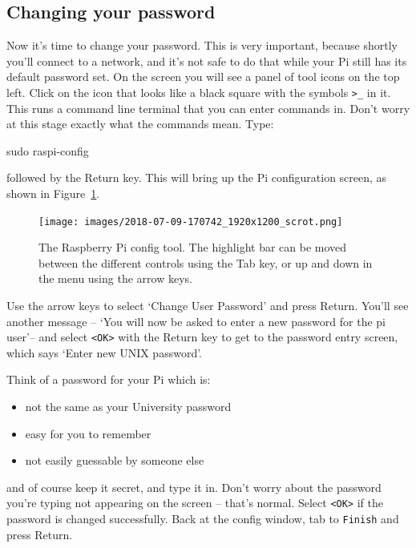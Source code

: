 \subsection{Changing your password}
\label{configscreen}

Now it's time to change your password. This is very important, because
shortly you'll connect to a network, and it's not safe to do that
while your Pi still has its default password set.  On the screen you
will see a panel of tool icons on the top left. 
\cbstart Click on the icon that
looks like a black square with the symbols \verb+>_+ in it. This runs a command line terminal that
you can enter commands in. Don't worry at this stage exactly what the
commands mean. Type:
\cbend

\begin{ttoutenv}
sudo raspi-config
\end{ttoutenv}

followed by the Return key. This will bring up the Pi configuration screen, as shown in Figure~\ref{figure:raspi-config}.

\begin{figure}
\centerline{\texttt{[image: images/2018-07-09-170742\_1920x1200\_scrot.png]}}
\caption{The Raspberry Pi config tool. The highlight bar can be moved between the different controls using the Tab key, or up and down in the menu using the arrow keys.}\label{figure:raspi-config}
\end{figure}


Use the arrow keys to select `Change User Password' and press Return.
You'll see another message -- `You will now be asked to enter a new password for the pi user'--  and select \verb+<OK>+ with the Return key to get to the password entry screen, which says `Enter new UNIX password'.

Think of a password for your Pi which is:
\begin{itemize}
\item not the same as your University password
\item easy for you to remember
\item not easily guessable by someone else
\end{itemize}
 
and of course keep it secret, and type it in. Don't worry about the password you're typing not appearing on the screen -- that's normal. Select \verb+<OK>+ if the password is changed successfully. Back at the config window, tab to \verb+Finish+ and press Return. 

